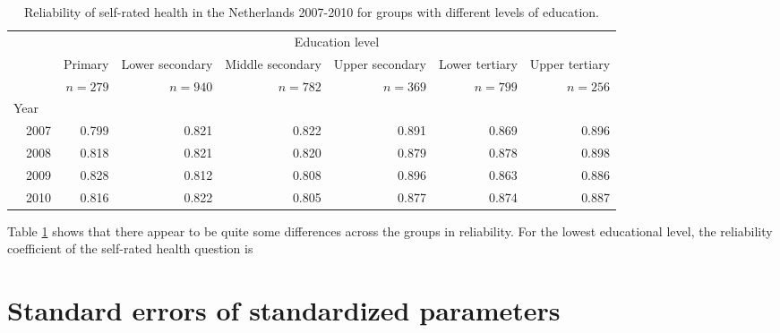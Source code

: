 \documentclass[a4paper, 11pt]{article}
\newcommand{\0}{\boldsymbol{0}}
\begin{document}
\begin{table}[ht]
\begin{center}
\begin{tabular}{lrrrrrrr}
  \hline  \hline
&  &\multicolumn{6}{c}{Education level}\\\cline{3-8}
&	&	Primary		& Lower secondary & Middle secondary & Upper secondary & Lower tertiary & Upper tertiary\\
&	&	$n=279$		&$n=940$	&		$n=782$	&$n=369$	&	$n=799$	&	$n=256$	\\	
                                                                                  
	\hline              
\multicolumn{2}{l}{Year}\\                                                      
&	2007	&	0.799	&	0.821	&		0.822	&0.891	&	0.869	&	0.896	\\	
                                                                                  
&	2008	&	0.818	&	0.821	&		0.820	&0.879	&	0.878	&	0.898	\\	
	                                                                          
&	2009	&	0.828	&	0.812	&		0.808	&0.896	&	0.863	&	0.886	\\	
	                                                                          
&	2010	&	0.816	&	0.822	&		0.805	&0.877	&	0.874	&	0.887	\\	
  \hline     \hline
\end{tabular}
\caption{Reliability of self-rated health in the Netherlands 2007-2010 for groups with different levels of education.}\label{tab:first-results}
\end{center}
\end{table}

Table \ref{tab:first-results} shows that there appear to be quite some differences across the groups in reliability. 
For the lowest educational level, the reliability coefficient of the self-rated health question is 

\section{Standard errors of standardized parameters}
\end{document}
